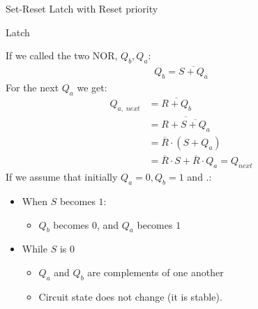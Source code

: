 \begin{parag}{Set-Reset Latch with Reset priority}
\begin{subparag}{Latch}
\begin{definition}
           \end{definition}
       \end{subparag} 
       If we called the two NOR, $Q_b, Q_a$:
       \begin{align*}
           Q_b = \overline{S + Q_a}
       \end{align*}
       For the next $Q_a$ we get:
       \begin{align*}
           Q_{a, \; next} &= \overline{R + Q_b}\\
           &= \overline{R + \overline{S + Q_a}}\\
           &= \overline{R} \cdot (S + Q_a)\\
           &= \overline{R} \cdot S + \overline{R} \cdot Q_a = Q_{next}
       \end{align*}
       If we assume that  initially $Q_a = 0, Q_b = 1$ and .:
       \begin{itemize}
           \item When $S$ becomes $1$:
               \begin{itemize}
                   \item $Q_b$ becomes $0$, and $Q_a$ becomes $1$
               \end{itemize}
           \item While $S$ is $0$
               \begin{itemize}
                   \item $Q_a$ and $Q_b$ are complements of one another
                   \item Circuit state does not change (it is stable).
               \end{itemize}
       \end{itemize}
       

\end{parag}
